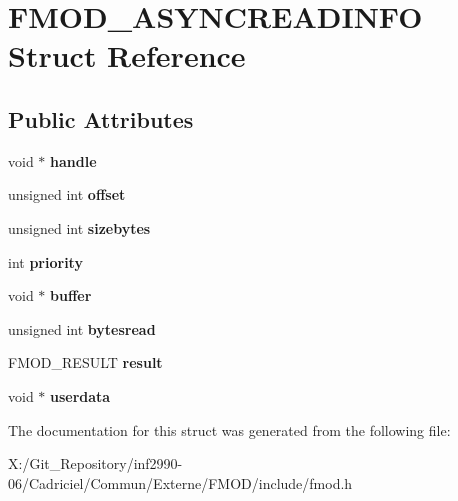 \hypertarget{struct_f_m_o_d___a_s_y_n_c_r_e_a_d_i_n_f_o}{\section{F\-M\-O\-D\-\_\-\-A\-S\-Y\-N\-C\-R\-E\-A\-D\-I\-N\-F\-O Struct Reference}
\label{struct_f_m_o_d___a_s_y_n_c_r_e_a_d_i_n_f_o}
}
\subsection*{Public Attributes}
\begin{DoxyCompactItemize}
\item 
\hypertarget{struct_f_m_o_d___a_s_y_n_c_r_e_a_d_i_n_f_o_a31e2e01864e3c97844a252f947ff8040}{void $\ast$ {\bfseries handle}}\label{struct_f_m_o_d___a_s_y_n_c_r_e_a_d_i_n_f_o_a31e2e01864e3c97844a252f947ff8040}

\item 
\hypertarget{struct_f_m_o_d___a_s_y_n_c_r_e_a_d_i_n_f_o_a8d42cc77cd8ef0559a666038e02a8807}{unsigned int {\bfseries offset}}\label{struct_f_m_o_d___a_s_y_n_c_r_e_a_d_i_n_f_o_a8d42cc77cd8ef0559a666038e02a8807}

\item 
\hypertarget{struct_f_m_o_d___a_s_y_n_c_r_e_a_d_i_n_f_o_a19cda62a563d8b9c3116411c13d207f6}{unsigned int {\bfseries sizebytes}}\label{struct_f_m_o_d___a_s_y_n_c_r_e_a_d_i_n_f_o_a19cda62a563d8b9c3116411c13d207f6}

\item 
\hypertarget{struct_f_m_o_d___a_s_y_n_c_r_e_a_d_i_n_f_o_aae5a4b76307bec7a0132b3abb04ab823}{int {\bfseries priority}}\label{struct_f_m_o_d___a_s_y_n_c_r_e_a_d_i_n_f_o_aae5a4b76307bec7a0132b3abb04ab823}

\item 
\hypertarget{struct_f_m_o_d___a_s_y_n_c_r_e_a_d_i_n_f_o_a2154c0c4825d5f133e0b14ca1b94b324}{void $\ast$ {\bfseries buffer}}\label{struct_f_m_o_d___a_s_y_n_c_r_e_a_d_i_n_f_o_a2154c0c4825d5f133e0b14ca1b94b324}

\item 
\hypertarget{struct_f_m_o_d___a_s_y_n_c_r_e_a_d_i_n_f_o_acef1543320ee49d5c723ce1dbd58e43b}{unsigned int {\bfseries bytesread}}\label{struct_f_m_o_d___a_s_y_n_c_r_e_a_d_i_n_f_o_acef1543320ee49d5c723ce1dbd58e43b}

\item 
\hypertarget{struct_f_m_o_d___a_s_y_n_c_r_e_a_d_i_n_f_o_a85e0137ab5748fbbd7ffee359823f57e}{F\-M\-O\-D\-\_\-\-R\-E\-S\-U\-L\-T {\bfseries result}}\label{struct_f_m_o_d___a_s_y_n_c_r_e_a_d_i_n_f_o_a85e0137ab5748fbbd7ffee359823f57e}

\item 
\hypertarget{struct_f_m_o_d___a_s_y_n_c_r_e_a_d_i_n_f_o_a8a273751e70e26c1a51540a18269eecc}{void $\ast$ {\bfseries userdata}}\label{struct_f_m_o_d___a_s_y_n_c_r_e_a_d_i_n_f_o_a8a273751e70e26c1a51540a18269eecc}

\end{DoxyCompactItemize}


The documentation for this struct was generated from the following file\-:\begin{DoxyCompactItemize}
\item 
X\-:/\-Git\-\_\-\-Repository/inf2990-\/06/\-Cadriciel/\-Commun/\-Externe/\-F\-M\-O\-D/include/fmod.\-h\end{DoxyCompactItemize}

